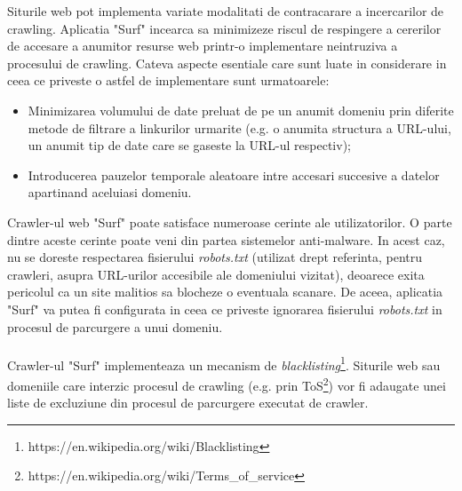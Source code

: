 Siturile web pot implementa variate modalitati de contracarare a incercarilor de crawling. Aplicatia "Surf" incearca sa minimizeze riscul de respingere a cererilor de accesare a anumitor resurse web printr-o implementare neintruziva a procesului de crawling. Cateva aspecte esentiale care sunt luate in considerare in ceea ce priveste o astfel de implementare sunt urmatoarele:

\begin{itemize}

	\item{Minimizarea volumului de date preluat de pe un anumit domeniu prin diferite metode de filtrare a linkurilor urmarite (e.g. o anumita structura a URL-ului, un anumit tip de date care se gaseste la URL-ul respectiv);}
	
	\item{Introducerea pauzelor temporale aleatoare intre accesari succesive a datelor apartinand aceluiasi domeniu.}
	
\end{itemize}

\noindent
Crawler-ul web "Surf" poate satisface numeroase cerinte ale utilizatorilor. O parte dintre aceste cerinte poate veni din partea sistemelor anti-malware. In acest caz, nu se doreste respectarea fisierului \emph{robots.txt} (utilizat drept referinta, pentru crawleri, asupra URL-urilor accesibile ale domeniului vizitat), deoarece exita pericolul ca un site malitios sa blocheze o eventuala scanare. De aceea, aplicatia "Surf" va putea fi configurata in ceea ce priveste ignorarea fisierului \emph{robots.txt} in procesul de parcurgere a unui domeniu.
\\
\\
Crawler-ul "Surf" implementeaza un mecanism de \emph{blacklisting}\footnote{https://en.wikipedia.org/wiki/Blacklisting}. Siturile web sau domeniile care interzic procesul de crawling (e.g. prin ToS\footnote{https://en.wikipedia.org/wiki/Terms\_of\_service}) vor fi adaugate unei liste de excluziune din procesul de parcurgere executat de crawler.
